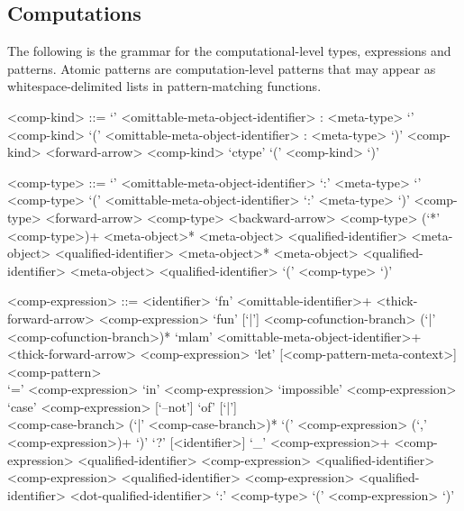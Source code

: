 \subsection{Computations}\label{section:syntax-computations}

The following is the grammar for the computational-level types, expressions and patterns.
Atomic patterns are computation-level patterns that may appear as whitespace-delimited lists in pattern-matching functions.

\begin{grammar}
<comp-kind> ::= `{' <omittable-meta-object-identifier> : <meta-type> `}' <comp-kind>
\alt `(' <omittable-meta-object-identifier> : <meta-type> `)' <comp-kind>
 <forward-arrow> <comp-kind>
\alt `ctype'
\alt `(' <comp-kind> `)'

<comp-type> ::= `{' <omittable-meta-object-identifier> `:' <meta-type> `}' <comp-type>
\alt `(' <omittable-meta-object-identifier> `:' <meta-type> `)' <comp-type>
 <forward-arrow> <comp-type>
 <backward-arrow> <comp-type>
 (`*' <comp-type>)+
 <meta-object>*
 <meta-object>
 <qualified-identifier> <meta-object>
 <qualified-identifier>
 <meta-object>*
 <meta-object>
 <qualified-identifier> <meta-object>
 <qualified-identifier>
\alt `(' <comp-type> `)'

<comp-expression> ::= <identifier>
\alt `fn' <omittable-identifier>+ <thick-forward-arrow> <comp-expression>
\alt `fun' [`|'] <comp-cofunction-branch> (`|' <comp-cofunction-branch>)*
\alt `mlam' <omittable-meta-object-identifier>+\\
<thick-forward-arrow> <comp-expression>
\alt `let' [<comp-pattern-meta-context>] <comp-pattern>\\
`=' <comp-expression> `in' <comp-expression>
\alt `impossible' <comp-expression>
\alt `case' <comp-expression> [`--not'] `of' [`|']\\
<comp-case-branch> (`|' <comp-case-branch>)*
\alt `(' <comp-expression> (`,' <comp-expression>)+ `)'
\alt `?' [<identifier>]
\alt `_'
 <comp-expression>+
 <comp-expression>
 <qualified-identifier> <comp-expression>
 <qualified-identifier>
 <comp-expression>
 <qualified-identifier> <comp-expression>
 <qualified-identifier>
 <dot-qualified-identifier>
 `:' <comp-type>
\alt `(' <comp-expression> `)'


\end{grammar}
